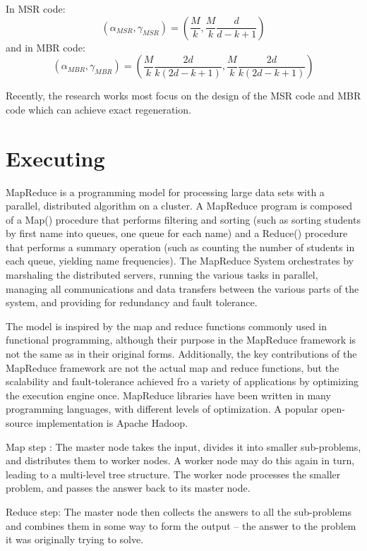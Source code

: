 \documentclass{article} %
\begin{document}
In MSR code:
\begin{equation}
(\alpha_{MSR}, \gamma_{MSR}) = ( \frac{M}{k}, \frac{M}{k} \frac{d}{d-k+1})
\end{equation}
and in MBR code:
\begin{equation}
(\alpha_{MBR}, \gamma_{MBR}) = ( \frac{M}{k}\frac{2d}{k(2d - k + 1)}, \frac{M}{k} \frac{2d}{k(2d-k+1)})
\end{equation}

Recently, the research works most focus on the design of the MSR code and MBR code which can achieve exact regeneration.

\section{Executing}
MapReduce is a programming model for processing large data sets with a parallel, distributed algorithm on a cluster. A MapReduce program is composed of a Map() procedure that performs filtering and sorting (such as sorting students by first name into queues, one queue for each name) and a Reduce() procedure that performs a summary operation (such as counting the number of students in each queue, yielding name frequencies). The MapReduce System orchestrates by marshaling the distributed servers, running the various tasks in parallel, managing all communications and data transfers between the various parts of the system, and providing for redundancy and fault tolerance.

	The model is inspired by the map and reduce functions commonly used in functional programming, although their purpose in the MapReduce framework is not the same as in their original forms. Additionally, the key contributions of the MapReduce framework are not the actual map and reduce functions, but the scalability and fault-tolerance achieved fro a variety of applications by optimizing the execution engine once. MapReduce libraries have been written in many programming languages, with different levels of optimization. A popular open-source implementation is Apache Hadoop.

	Map step : The master node takes the input, divides it into smaller sub-problems, and distributes them to worker nodes. A worker node may do this again in turn, leading to a multi-level tree structure. The worker node processes the smaller problem, and passes the answer back to its master node.

	Reduce step: The master node then collects the answers to all the sub-problems and combines them in some way to form the output – the answer to the problem it was originally trying to solve.
\end{document}
